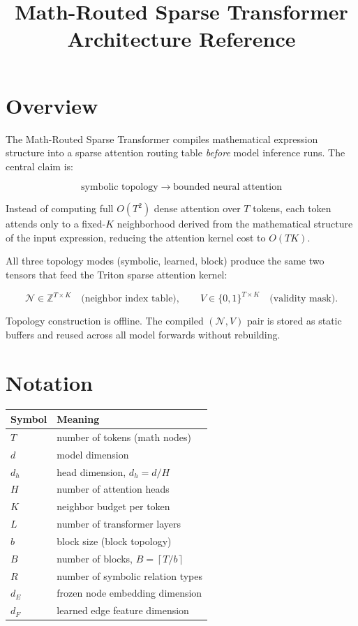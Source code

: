 \documentclass[11pt]{article}
\title{\textbf{Math-Routed Sparse Transformer}\\[6pt]
\large Architecture Reference}
\author{}
\date{}
\newcommand{\ceil}[1]{\left\lceil #1 \right\rceil}
\begin{document}
\maketitle

\section*{Overview}

The Math-Routed Sparse Transformer compiles mathematical expression structure
into a sparse attention routing table \emph{before} model inference runs.
The central claim is:

\[
\boxed{
  \text{symbolic topology}
  \;\longrightarrow\;
  \text{bounded neural attention}
}
\]

Instead of computing full $O(T^{2})$ dense attention over $T$ tokens,
each token attends only to a fixed-$K$ neighborhood derived from the
mathematical structure of the input expression,
reducing the attention kernel cost to $O(TK)$.

\medskip
All three topology modes (symbolic, learned, block) produce the same
two tensors that feed the Triton sparse attention kernel:

\[
\mathcal{N} \in \mathbb{Z}^{T \times K}
\quad\text{(neighbor index table)},
\qquad
V \in \{0,1\}^{T \times K}
\quad\text{(validity mask)}.
\]

Topology construction is offline.  The compiled $(\mathcal{N}, V)$ pair
is stored as static buffers and reused across all model forwards
without rebuilding.

\section*{Notation}

\begin{center}
\begin{tabular}{ll}
\toprule
Symbol & Meaning \\
\midrule
$T$       & number of tokens (math nodes) \\
$d$       & model dimension \\
$d_h$     & head dimension, $d_h = d / H$ \\
$H$       & number of attention heads \\
$K$       & neighbor budget per token \\
$L$       & number of transformer layers \\
$b$       & block size (block topology) \\
$B$       & number of blocks, $B = \ceil{T/b}$ \\
$R$       & number of symbolic relation types \\
$d_E$     & frozen node embedding dimension \\
$d_F$     & learned edge feature dimension \\
\bottomrule
\end{tabular}
\end{center}
\end{document}
